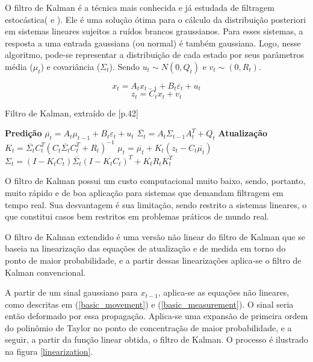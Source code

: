\documentclass[a4paper,11pt]{article}
\begin{document}
O filtro de Kalman é a técnica mais conhecida e já estudada de filtragem estocástica(\cite{P.Robotics} e \cite{Optimal_Filtering}). Ele é uma solução ótima para o cálculo da distribuição posteriori em sistemas lineares sujeitos a ruídos brancos graussianos. Para esses sistemas, a resposta a uma entrada gaussiana (ou normal) é também gaussiana. Logo, nesse algoritmo, pode-se representar a distribuição de cada estado por seus parâmetros média ($\mu_t$) e covariância ($\Sigma_t$). Sendo $u_t\sim N(0,Q_t)$ e $v_t\sim (0,R_t)$.

\begin{equation}
    \label{linear_movement}
    x_t=A_t x_{t-1} + B_t\varepsilon_t + u_t
\end{equation}
\begin{equation}
    \label{linear_measurement}
    z_t = C_t x_t + v_t
\end{equation}

\begin{algorithm} 
\caption{Filtro de Kalman, extraído de  [\cite{P.Robotics}p.42]}
\label{alg1}
\begin{algorithmic}[1]
\State \textbf{Predição}
\State $\overline{\mu_t} = A_t \mu_{t-1} + B_t\varepsilon_t + u_t$
\State $\overline{\Sigma_t} = A_t\Sigma_{t-1}A_t^{T}+Q_t$
\State \textbf{Atualização}
\State $K_t=\overline{\Sigma_t}C_t^{T}(C_t\overline{\Sigma_t}C_t^{T}+R_t)^{-1}$
\State $\mu_t = \overline{\mu_t} + K_t(z_t-C_t\overline{\mu_t})$
\State $\Sigma_t=(I-K_t C_t)\overline{\Sigma_t}(I-K_t C_t)^{T}+K_t R_t K_t^{T}$
\EndFunction
\end{algorithmic}
\end{algorithm}

O filtro de Kalman possui um custo computacional muito baixo, sendo, portanto, muito rápido e de boa aplicação para sistemas que demandam filtragem em tempo real. Sua desvantagem é sua limitação, sendo restrito a sistemas lineares, o que constitui casos bem restritos em problemas práticos de mundo real.

O filtro de Kalman extendido \cite{Optimal_Filtering} é uma versão não linear do filtro de Kalman que se baseia na linearização das equações de atualização e de medida em torno do ponto de maior probabilidade, e a partir dessas linearizações aplica-se o filtro de Kalman convencional.

A partir de um sinal gaussiano para $x_{t-1}$, aplica-se as equações não lineares, como descritas em (\ref{basic_movement}) e (\ref{basic_measurement}). O sinal seria então deformado por essa propagação. Aplica-se uma expansão de primeira ordem do polinômio de Taylor no ponto de concentração de maior probabilidade, e a seguir, a partir da função linear obtida, o filtro de Kalman. O processo é ilustrado na figura \ref{linearization}.
\end{document}

